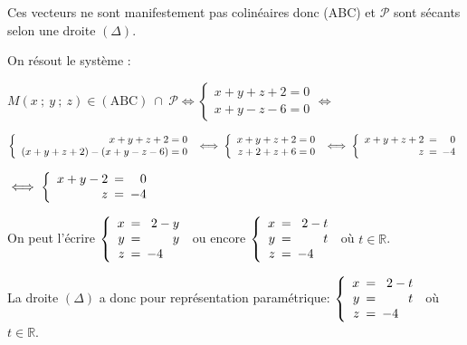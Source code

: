 \documentclass[10pt]{article}
\providecommand{\R}{\mathbb{R}}
\begin{document}
\begin{enumerate}[resume]
Ces vecteurs ne sont manifestement pas colinéaires donc (ABC) et $\mathcal{P}$ sont sécants selon une droite $(\Delta)$.

\smallskip

On résout le système :

$M(x~;~y~;~z) \in (\text{ABC}) \:\cap \:\mathcal{P} \iff \left \{
\begin{array}{r}
x+y+z+2=0\\
x+y-z-6=0
\end{array}
\right.
\iff $

$\left\{
\begin{array}{r}
x+y+z+2=0\\
(x+y+z+2)-(x+y-z-6)=0
\end{array}
\right.\iff
\left\{
\begin{array}{r}
x+y+z+2=0\\
z+2+z+6=0
\end{array}
\right .
\iff
\left \{
\begin{array}{r !{=} r}
x+y+z+2 & 0\\
z&-4
\end{array}
\right .$

$\iff
\left \{
\begin{array}{r !{=} r}
x + y -2& 0\\
z&-4
\end{array}
\right .$

On peut l'écrire
$\left \{
\begin{array}{r !{=} r}
x& 2-y\\
y&y\\
z&-4\phantom{-y}
\end{array}
\right .$
ou encore
$\left \{
\begin{array}{r !{=} r}
x& 2-t\\
y&t\\
z&-4\phantom{-t}
\end{array}
\right .$ où $t\in\R$.

La droite $(\Delta)$ a donc pour représentation paramétrique:
$\left \{
\begin{array}{r !{=} r}
x& 2-t\\
y&t\\
z&-4\phantom{-t}
\end{array}
\right .$ où $t\in\R$.
\end{enumerate}
\end{document}

